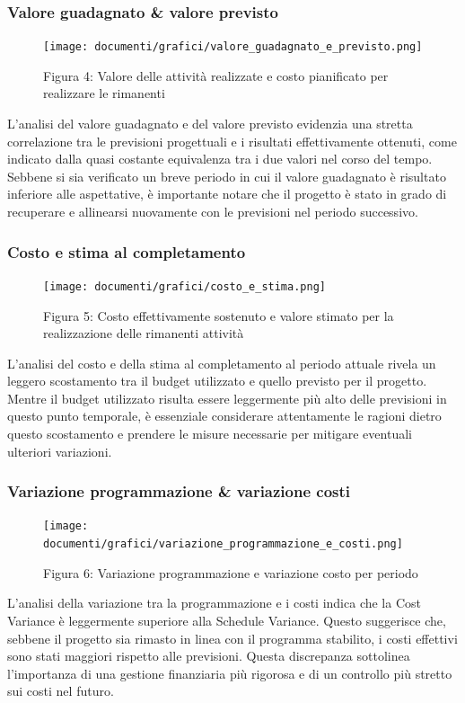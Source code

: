 \documentclass{article}
\begin{document}
{\subsubsection{Valore guadagnato \& valore previsto}
\begin{figure}[H]
    \centering
    \texttt{[image: documenti/grafici/valore\_guadagnato\_e\_previsto.png]}
    \caption{Figura 4: Valore delle attività realizzate e costo pianificato per realizzare le rimanenti}
    \end{figure}
    L'analisi del valore guadagnato e del valore previsto evidenzia una stretta correlazione tra le previsioni progettuali e i risultati effettivamente ottenuti, come indicato dalla quasi costante equivalenza tra i due valori nel corso del tempo. Sebbene si sia verificato un breve periodo in cui il valore guadagnato è risultato inferiore alle aspettative, è importante notare che il progetto è stato in grado di recuperare e allinearsi nuovamente con le previsioni nel periodo successivo.
\subsubsection{Costo e stima al completamento}
    
    \begin{figure}[H]
    \centering
    \texttt{[image: documenti/grafici/costo\_e\_stima.png]}
    \caption{Figura 5: Costo effettivamente sostenuto e valore stimato per la realizzazione delle rimanenti attività}
\end{figure}
L'analisi del costo e della stima al completamento al periodo attuale rivela un leggero scostamento tra il budget utilizzato e quello previsto per il progetto. Mentre il budget utilizzato risulta essere leggermente più alto delle previsioni in questo punto temporale, è essenziale considerare attentamente le ragioni dietro questo scostamento e prendere le misure necessarie per mitigare eventuali ulteriori variazioni.

\subsubsection{Variazione programmazione \& variazione costi}
\begin{figure}[H]
    \centering
    \texttt{[image: documenti/grafici/variazione\_programmazione\_e\_costi.png]}
    \caption{Figura 6: Variazione programmazione e variazione costo per periodo}
    \end{figure}
    L'analisi della variazione tra la programmazione e i costi indica che la Cost Variance è leggermente superiore alla Schedule Variance. Questo suggerisce che, sebbene il progetto sia rimasto in linea con il programma stabilito, i costi effettivi sono stati maggiori rispetto alle previsioni. Questa discrepanza sottolinea l'importanza di una gestione finanziaria più rigorosa e di un controllo più stretto sui costi nel futuro.
}
\end{document}
